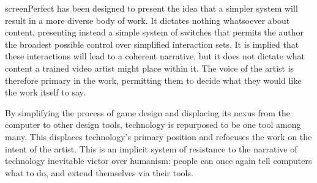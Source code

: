 screenPerfect has been designed to present the idea that a simpler system will result in a more diverse body of work. It dictates nothing whatsoever about content, presenting instead a simple system of switches that permits the author the broadest possible control over simplified interaction sets. It is implied that these interactions will lead to a coherent narrative, but it does not dictate what content a trained video artist might place within it. The voice of the artist is therefore primary in the work, permitting them to decide what they would like the work itself to say.

By simplifying the process of game design and displacing its nexus from the computer to other design tools, technology is repurposed to be one tool among many. This displaces technology's primary position and refocuses the work on the intent of the artist. This is an implicit system of resistance to the narrative of technology inevitable victor over humanism: people can once again tell computers what to do, and extend themselves via their tools.

